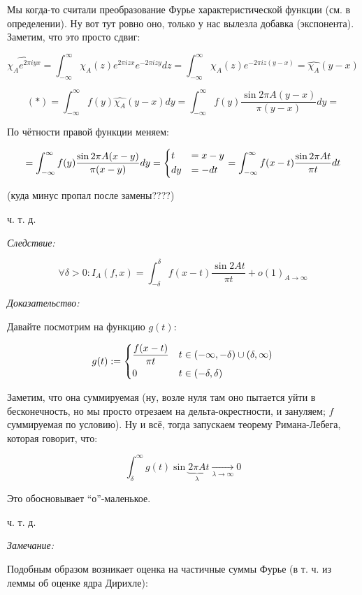 \documentclass{article}
\def\goesto#1{\underset{#1}{\longrightarrow}}
\begin{document}
Мы когда-то считали преобразование Фурье характеристической функции (см. в определении). Ну вот тут ровно оно, только у нас вылезла добавка (экспонента). Заметим, что это просто сдвиг:

\[\widehat{\chi_Ae^{2\pi i y x}} = \int_{-\infty}^{\infty} \chi_A(z)e^{2\pi i z x}e^{- 2 \pi i z y}dz = \int_{-\infty}^{\infty} \chi_A(z)e^{-2\pi i z (y - x)} = \hat{\chi_A}(y - x)\]

\[(*) = \int_{-\infty}^{\infty} f(y) \hat{\chi_A}(y - x) dy = \int_{-\infty}^{\infty} f(y) \frac{\sin 2\pi A (y - x)}{\pi(y - x)} dy = \]

По чётности правой функции меняем:

\[ = \int_{-\infty}^{\infty} f(y) \frac{\sin 2\pi A (x - y)}{\pi(x - y)} dy = \begin{dcases}
    t &= x - y\\
    dy &= -dt
\end{dcases} = \int_{-\infty}^{\infty} f(x - t) \frac{\sin 2\pi At}{\pi t} dt\]

(куда минус пропал после замены????)

ч. т. д. 

\textit{Следствие: }

\[\forall \delta > 0: I_A(f, x) = \int_{-\delta}^{\delta} f(x - t)\frac{\sin 2At}{\pi t} + o(1)_{A \rightarrow \infty}\]

\textit{Доказательство:}

Давайте посмотрим на функцию $g(t)$:

\[g(t) := \begin{dcases}
    \frac{f(x - t)}{\pi t} &t \in (-\infty, -\delta) \cup (\delta, \infty)\\
    0 &t \in (-\delta, \delta)
\end{dcases}\]

Заметим, что она суммируемая (ну, возле нуля там оно пытается уйти в бесконечность, но мы просто отрезаем на дельта-окрестности, и зануляем; $f$ суммируемая по условию). Ну и всё, тогда запускаем теорему Римана-Лебега, которая говорит, что:

\[\int_{\delta}^{\infty} g(t)\sin \underbrace{2\pi A}_{\lambda}t \goesto{\lambda \rightarrow \infty} 0\]

Это обосновывает ``о''-маленькое.

ч. т. д.

\textit{Замечание: }

Подобным образом возникает оценка на частичные суммы Фурье (в т. ч. из леммы об оценке ядра Дирихле):
\end{document}
